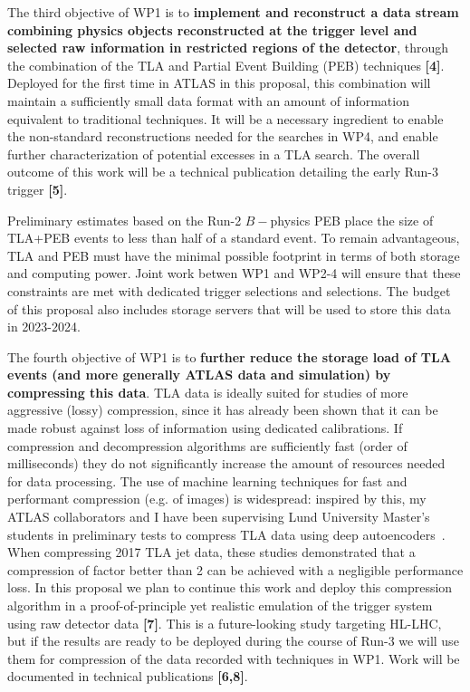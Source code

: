 The third objective of WP1 is to \textbf{implement and reconstruct a data stream combining physics objects reconstructed at the trigger level and selected raw information in restricted regions of the detector}, through the combination of the TLA and Partial Event Building (PEB) techniques \textbf{[4]}. 
Deployed for the first time in ATLAS in this proposal, this combination will maintain a sufficiently small data format with an amount of information equivalent to traditional techniques. 
It will be a necessary ingredient to enable the non-standard reconstructions needed for the searches in WP4, and enable further characterization of potential excesses in a TLA search. 
The overall outcome of this work will be a technical publication detailing the early Run-3 trigger \textbf{[5]}.  

Preliminary estimates based on the Run-2 $B-$physics PEB %
place the size of TLA+PEB events to less than half of a standard event. 
To remain advantageous, TLA and PEB must have the minimal possible footprint in terms of both storage and computing power. 
Joint work betwen WP1 and WP2-4 will ensure that these constraints are met with dedicated trigger selections and selections.   
The budget of this proposal also includes storage servers that will be used to store this data in 2023-2024. 

The fourth objective of WP1 is to \textbf{further reduce the storage load of TLA events (and more generally ATLAS data and simulation) by compressing this data}. 
TLA data is ideally suited for studies of more aggressive (lossy) compression, since it has already been shown that it can be made robust against loss of information using dedicated calibrations. If compression and decompression algorithms are sufficiently fast (order of milliseconds) they do not significantly increase the amount of resources needed for data processing. 
The use of machine learning techniques for fast and performant compression (e.g. of images) is widespread: inspired by this, my ATLAS collaborators and I have been supervising Lund University Master’s students in preliminary tests to compress TLA data using deep autoencoders~\cite{ToBeCited}. %
When compressing 2017 TLA jet data, these studies demonstrated that a compression of factor better than 2 can be achieved with a negligible performance loss.  
In this proposal we plan to continue this work and deploy this compression algorithm in a proof-of-principle yet realistic emulation of the trigger system using raw detector data \textbf{[7]}. This is a future-looking study targeting HL-LHC, but if the results are ready to be deployed during the course of Run-3 we will use them for compression of the data recorded with techniques in WP1. Work will be documented in technical publications \textbf{[6,8]}.


